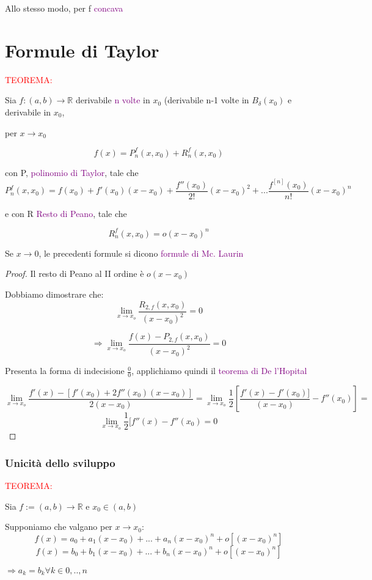 \documentclass{article}
\begin{document}
Allo stesso modo, per f \textcolor{purple}{concava}
\section{Formule di Taylor}

 \begin{tcolorbox}[colback= red!15!yellow!5!white, colframe=red]
  \textcolor{red}{TEOREMA: }
  
Sia $f:(a,b) \to \mathbb{R}$ derivabile \textcolor{purple}{n volte} in $x_0$ (derivabile n-1 volte in $B_{\delta}(x_0)$ e derivabile in $x_0$, 

per $x \to x_0$ 

\[f(x)= P_{n}^f(x, x_0) + R_{n}^f(x, x_0) \]

\end{tcolorbox}


con P, \textcolor{purple}{polinomio di Taylor}, tale che
\[P_{n}^f(x,x_0) = f(x_0) +f'(x_0)(x - x_0) + \frac{f''(x_0)}{2!}(x-x_0)^2 + ...  \frac{f^{[n]}(x_0)}{n!}(x-x_0)^n \]

e con R \textcolor{purple}{Resto di Peano}, tale che 

\[ R_{n}^f(x,x_0)= o(x-x_0)^n \]


Se $x \to 0$, le precedenti formule si dicono \textcolor{purple}{formule di Mc. Laurin}

\begin{proof}
    Il resto di Peano al II ordine è $o(x-x_0)$

Dobbiamo dimostrare che: 
    \[\lim_{x\to x_o}\frac{R_{2,f}(x,x_0)}{(x-x_0)^2}=0 \]
    
    \[\Rightarrow \lim_{x\to x_o}\frac{f(x)-P_{2,f}(x,x_0)}{(x-x_0)^2}=0\]

    Presenta la forma di indecisione $\frac{0}{0}$, applichiamo quindi il \textcolor{purple}{teorema di De l'Hopital}

    \[\lim_{x\to x_o}\frac{f'(x)-[f'(x_0)+2f''(x_0)(x-x_0)]}{2(x-x_0)}=\lim_{x\to x_o}\frac{1}{2} \left[ \frac{f'(x)-f'(x_0)]}{(x-x_0)} - f''(x_0) \right]= \] 
    \[\lim_{x\to x_o}\frac{1}{2} [f''(x) -f''(x_0) =0\]
\end{proof}

\subsubsection{Unicità dello sviluppo}

\begin{tcolorbox}[colback= red!15!yellow!5!white, colframe=red]
  \textcolor{red}{TEOREMA: }

Sia $f:=(a,b) \to \mathbb{R}$ e $x_0 \in (a, b)$

Supponiamo che valgano per $x \to x_0$: 
\[f(x)=a_0 + a_1(x-x_0)+...+a_n(x-x_0)^n + o[(x-x_0)^n]\]
\[f(x)=b_0 + b_1(x-x_0)+...+b_n(x-x_0)^n + o[(x-x_0)^n]\]

$\Rightarrow a_k = b_k \forall k \in 0,..,n$
\end{tcolorbox}
\end{document}
